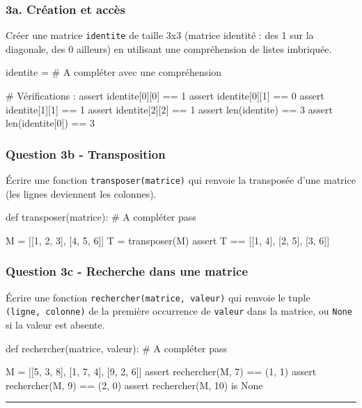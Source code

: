 \subsubsection{3a. Création et accès}

Créer une matrice \lstinline|identite| de taille 3x3 (matrice identité :
des 1 sur la diagonale, des 0 ailleurs) en utilisant une compréhension
de listes imbriquée.

\begin{python}
identite = # A compléter avec une compréhension

# Vérifications :
assert identite[0][0] == 1
assert identite[0][1] == 0
assert identite[1][1] == 1
assert identite[2][2] == 1
assert len(identite) == 3
assert len(identite[0]) == 3
\end{python}

\subsubsection{Question 3b - Transposition}

Écrire une fonction \texttt{transposer(matrice)} qui renvoie la
transposée d'une matrice (les lignes deviennent les colonnes).

\begin{python}
def transposer(matrice):
    # A compléter
    pass

M = [[1, 2, 3], [4, 5, 6]]
T = transposer(M)
assert T == [[1, 4], [2, 5], [3, 6]]
\end{python}

\subsubsection{Question 3c - Recherche dans une matrice}

Écrire une fonction \texttt{rechercher(matrice,\ valeur)} qui renvoie le
tuple \texttt{(ligne,\ colonne)} de la première occurrence de
\texttt{valeur} dans la matrice, ou \texttt{None} si la valeur est
absente.

\begin{python}
def rechercher(matrice, valeur):
    # A compléter
    pass

M = [[5, 3, 8], [1, 7, 4], [9, 2, 6]]
assert rechercher(M, 7) == (1, 1)
assert rechercher(M, 9) == (2, 0)
assert rechercher(M, 10) is None
\end{python}

\begin{center}\rule{0.5\linewidth}{0.5pt}\end{center}

